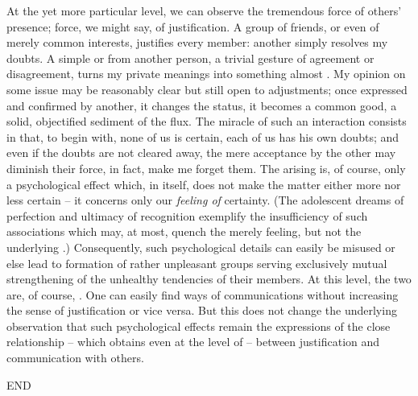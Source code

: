 {\act At the yet more particular level, we can observe the tremendous force of
others' presence; force, we might say, of justification. A group of friends, or
even of merely common interests, justifies every member: another simply resolves
my doubts. A simple  or  from another person, a trivial gesture
of agreement or disagreement, turns my private meanings into something almost
. My opinion on some issue may be reasonably clear but still open
to adjustments; once expressed and confirmed by another, it changes the status,
it becomes a common good, a solid, {objectified} sediment of the
 flux. The miracle of such an interaction consists in that, to
begin with, none of us is certain, each of us has his own doubts; and even if
the doubts are not cleared away, the mere acceptance by the other may diminish
their force, in fact, make me forget them. The arising  is, of
course, only a psychological effect which, in itself, does not make the matter
either more nor less certain -- it concerns only our {\em feeling of}
certainty. (The adolescent dreams of perfection and ultimacy of recognition
exemplify the insufficiency of such  associations which may, at most, quench the
merely  feeling, but not the underlying .)
Consequently, such psychological details can easily be misused or else lead to
formation of rather unpleasant groups serving exclusively mutual strengthening
of the unhealthy tendencies of their members.  At this level, the two
 are, of course, . One can easily find ways of
communications without increasing the sense of justification or vice versa. But
this does not change the underlying observation that such psychological effects 
remain the 
expressions of the close relationship -- which obtains even at the level of
 -- between justification and communication with others.

END 
}



